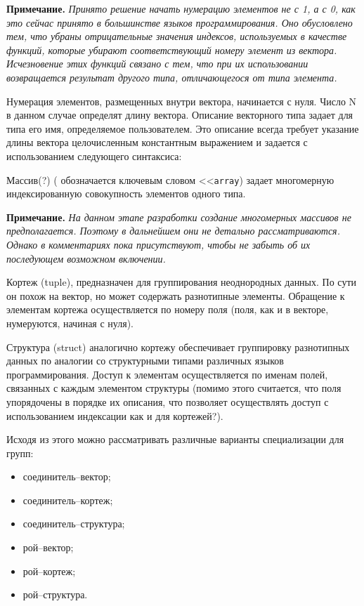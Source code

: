 {\textbf{Примечание.}
\textit{Принято решение начать нумерацию элементов не с 1, а с 0, как это сейчас принято в большинстве языков программирования. Оно обусловлено тем, что убраны отрицательные значения индексов, используемых в качестве функций, которые убирают соответствующий номеру элемент из вектора. Исчезновение этих функций связано с тем, что при их использовании возвращается результат другого типа, отличающегося от типа элемента.}

Нумерация элементов, размещенных внутри вектора, начинается с нуля. Число N в данном случае определят длину вектора. Описание векторного типа задает для типа его имя, определяемое пользователем. Это описание всегда требует указание длины вектора целочисленным константным выражением и задается с использованием следующего синтаксиса:

Массив(?) ( обозначается ключевым словом <<\verb|array|) задает многомерную индексированную совокупность элементов одного типа.

\textbf{Примечание.}
\textit{На данном этапе разработки создание многомерных массивов не предполагается. Поэтому в дальнейшем они не детально рассматриваются. Однако в комментариях пока присутствуют, чтобы не забыть об их последующем возможном включении.}

Кортеж (tuple), предназначен для группирования неоднородных данных. По сути он похож на вектор, но может содержать разнотипные элементы. Обращение к элементам кортежа осуществляется по номеру поля (поля, как и в векторе, нумеруются, начиная с нуля).

Структура (struct) аналогично кортежу обеспечивает группировку разнотипных данных по аналогии со структурными типами различных языков программирования. Доступ к элементам осуществляется по именам полей, связанных с каждым элементом структуры (помимо этого считается, что поля упорядочены в порядке их описания, что позволяет осуществлять доступ с использованием индексации как и для кортежей?).

Исходя из этого можно рассматривать различные варианты специализации для групп:
\begin{itemize}
    \item соединитель--вектор;
    \item соединитель--кортеж;
    \item соединитель--структура;
    \item рой--вектор;
    \item рой--кортеж;
    \item рой--структура.
\end{itemize}

}

